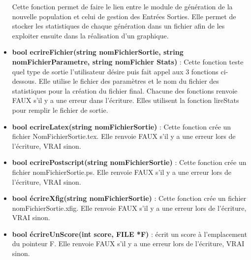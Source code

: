 \documentclass[a4paper,11pt]{article}
\begin{document}
\begin{itemize}
					Cette fonction permet de faire le lien entre le module de génération de la nouvelle population et celui de gestion des Entrées Sorties. 
					Elle permet de stocker les statistiques de chaque génération dans un fichier afin de les exploiter ensuite dans la réalisation d’un graphique.\vspace{0.2cm}
				\item \textbf{bool ecrireFichier(string nomFichierSortie, string nomFichierParametre, string nomFichier Stats)} : Cette fonction teste quel type de sortie l’utilisateur désire puis fait appel aux 3 fonctions ci-dessous. 
					Elle utilise le fichier des paramètres et le nom du fichier des statistiques pour la création du fichier final. 
					Chacune des fonctions renvoie FAUX s’il y a une erreur dans l’écriture. Elles utilisent la fonction lireStats pour remplir le fichier de sortie.\vspace{0.2cm}
				\item \textbf{bool ecrireLatex(string nomFichierSortie)} : Cette fonction crée un fichier NomFichierSortie.tex.
					Elle renvoie FAUX s’il y a une erreur lors de l’écriture, VRAI sinon.\vspace{0.2cm}
				\item \textbf{bool ecrirePostscript(string nomFichierSortie)}  : Cette fonction crée un fichier nomFichierSortie.ps.
					Elle renvoie FAUX s’il y a une erreur lors de l’écriture, VRAI sinon.\vspace{0.2cm}
				\item \textbf{bool écrireXfig(string nomFichierSortie)}  : Cette fonction crée un fichier nomFichierSortie.xfig.
					Elle renvoie FAUX s’il y a une erreur lors de l’écriture, VRAI sinon.\vspace{0.2cm}
				\item \textbf{bool écrireUnScore(int score, FILE *F)} : écrit un score à l’emplacement du pointeur F.
					Elle renvoie FAUX s’il y a une erreur lors de l’écriture, VRAI sinon. \\
			\end{itemize}
			
\end{document}
